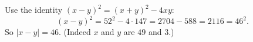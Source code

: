 Use the identity $(x-y)^2=(x+y)^2-4xy$:
\[
(x-y)^2=52^2-4\cdot147=2704-588=2116=46^2 .
\]
So $|x-y|=\boxed{46}$. (Indeed $x$ and $y$ are $49$ and $3$.)
